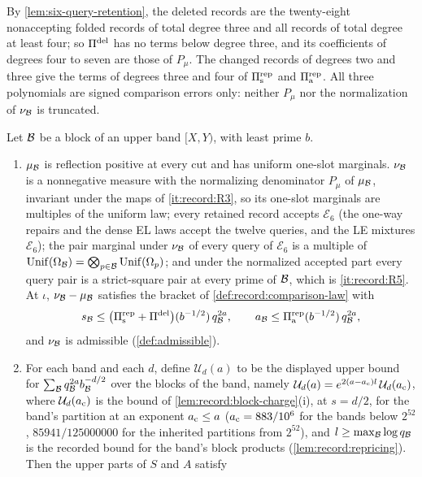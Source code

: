 By \cref{lem:six-query-retention}, the deleted records are the twenty-eight
nonaccepting folded records of total degree three and all records of total degree
at least four; so $\Pi^{\rm del}$ has no terms below degree three, and its
coefficients of degrees four to seven are those of $P_\mu$. The changed records of
degrees two and three give the terms of degrees three and four of
$\Pi^{\rm rep}_{\rm s}$ and $\Pi^{\rm rep}_{\rm a}$. All three polynomials are signed
comparison errors only: neither $P_\mu$ nor the normalization of $\nu_\Blk$ is
truncated.

\begin{proposition}\label{prop:record:upper}
Let $\Blk$ be a block of an upper band $[X,Y)$, with least prime $b$.
\begin{enumerate}[label=(\roman*)]
\item $\mu_\Blk$ is reflection positive at every cut and has uniform one-slot
 marginals. $\nu_\Blk$ is a nonnegative measure with the normalizing
 denominator $P_\mu$ of $\mu_\Blk$, invariant under the maps of
 \ref{it:record:R3}, so its one-slot marginals are multiples of the uniform
 law; every retained record accepts $\mathcal E_6$ (the one-way repairs and the
 dense EL laws accept the twelve queries, and the LE mixtures $\mathcal E_6$); the
 pair marginal under $\nu_\Blk$ of every query of $\mathcal E_6$ is a multiple of
 $\Unif(\Om[\Blk])=\bigotimes_{p\in\Blk}\Unif(\Om)$; and under the normalized
 accepted part every query pair is a strict-square pair at every prime of $\Blk$,
 which is \ref{it:record:R5}. At $\iota$, $\nu_\Blk-\mu_\Blk$ satisfies the bracket
 of \cref{def:record:comparison-law} with
 \[
  s_\Blk\le\bigl(\Pi^{\rm rep}_{\rm s}+\Pi^{\rm del}\bigr)(b^{-1/2})\,q_\Blk^{2a},\qquad
  a_\Blk\le\Pi^{\rm rep}_{\rm a}(b^{-1/2})\,q_\Blk^{2a},
 \]
 and $\nu_\Blk$ is admissible (\cref{def:admissible}).
\item For each band and each $d$, define $\mathcal U_d(a)$ to be
 the displayed upper bound for
 $\sum_\Blk q_\Blk^{2a}b_\Blk^{-d/2}$ over the blocks of the
 band, namely
 $\mathcal U_d(a)=e^{2(a-a_{\rm c})l}\,\mathcal U_d(a_{\rm c})$, where
 $\mathcal U_d(a_{\rm c})$ is the bound of \cref{lem:record:block-charge}(i), at
 $s=d/2$, for the band's partition at an exponent $a_{\rm c}\le a$ ($a_{\rm c}=883/10^6$
 for the bands below $2^{52}$, $85941/125000000$ for the inherited partitions from
 $2^{52}$), and $l\ge\max_\Blk\log q_\Blk$ is the recorded bound for the band's block
 products (\cref{lem:record:repricing}). Then the upper parts of $S$ and $A$ satisfy

\end{enumerate}
\end{proposition}
